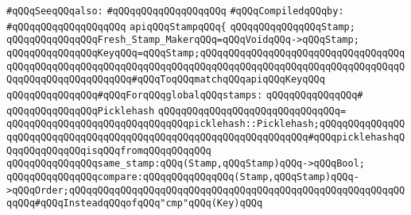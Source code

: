 \verb|#qQQqSeeqQQqalso:|\newline
\verb|#qQQqqQQqqQQqqQQqqQQq|\newline
\newline
\verb|#qQQqCompiledqQQqby:|\newline
\verb|#qQQqqQQqqQQqqQQqqQQq|\newline
\newline
\newline
\newline
\verb|apiqQQqStampqQQq{|\newline
\newline
\verb|qQQqqQQqqQQqqQQqStamp;|\newline
\verb|qQQqqQQqqQQqqQQqFresh_Stamp_MakerqQQq=qQQqVoidqQQq->qQQqStamp;|\newline
\newline
\verb|qQQqqQQqqQQqqQQqKeyqQQq=qQQqStamp;qQQqqQQqqQQqqQQqqQQqqQQqqQQqqQQqqQQqqQQqqQQqqQQqqQQqqQQqqQQqqQQqqQQqqQQqqQQqqQQqqQQqqQQqqQQqqQQqqQQqqQQqqQQqqQQqqQQqqQQqqQQqqQQq#qQQqToqQQqmatchqQQqapiqQQqKeyqQQq|\newline
\newline
\verb|qQQqqQQqqQQqqQQq#qQQqForqQQqglobalqQQqstamps:|\newline
\verb|qQQqqQQqqQQqqQQq#|\newline
\verb|qQQqqQQqqQQqqQQqPicklehash|\newline
\verb|qQQqqQQqqQQqqQQqqQQqqQQqqQQqqQQq=|\newline
\verb|qQQqqQQqqQQqqQQqqQQqqQQqqQQqqQQqpicklehash::Picklehash;qQQqqQQqqQQqqQQqqQQqqQQqqQQqqQQqqQQqqQQqqQQqqQQqqQQqqQQqqQQqqQQqqQQq#qQQqpicklehashqQQqqQQqqQQqqQQqisqQQqfromqQQqqQQqqQQq|\newline
\newline
\newline
\newline
\verb|qQQqqQQqqQQqqQQqsame_stamp:qQQq(Stamp,qQQqStamp)qQQq->qQQqBool;|\newline
\verb|qQQqqQQqqQQqqQQqcompare:qQQqqQQqqQQqqQQq(Stamp,qQQqStamp)qQQq->qQQqOrder;qQQqqQQqqQQqqQQqqQQqqQQqqQQqqQQqqQQqqQQqqQQqqQQqqQQqqQQqqQQqqQQq#qQQqInsteadqQQqofqQQq"cmp"qQQq(Key)qQQq|\newline
